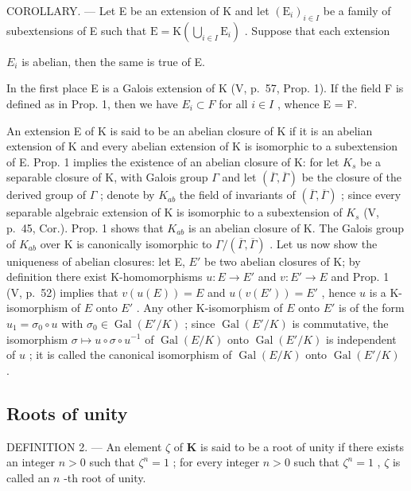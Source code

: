 COROLLARY. --- Let E be an extension of K and let \((\mathrm{E}_{i})_{i\in I}\) be a family of subextensions of E such that \(\mathrm{E}=\mathrm{K}\left(\bigcup_{i\in I}\mathrm{E}_{i}\right)\) . Suppose that each extension

\(E_{i}\) is abelian, then the same is true of E.

In the first place E is a Galois extension of K (V, p.~57, Prop. 1). If the field F is defined as in Prop. 1, then we have \(E_{i} \subset F\) for all \(i \in I\) , whence E = F.

An extension E of K is said to be an abelian closure of K if it is an abelian extension of K and every abelian extension of K is isomorphic to a subextension of E. Prop. 1 implies the existence of an abelian closure of K: for let \(K_{s}\) be a separable closure of K, with Galois group \(\Gamma\) and let \((\overline{\Gamma},\overline{\Gamma})\) be the closure of the derived group of \(\Gamma\) ; denote by \(K_{ab}\) the field of invariants of \((\overline{\Gamma},\overline{\Gamma})\) ; since every separable algebraic extension of K is isomorphic to a subextension of \(K_{s}\) (V, p.~45, Cor.). Prop. 1 shows that \(K_{ab}\) is an abelian closure of K. The Galois group of \(K_{ab}\) over K is canonically isomorphic to \(\Gamma/(\overline{\Gamma},\overline{\Gamma})\) . Let us now show the uniqueness of abelian closures: let E, \(E'\) be two abelian closures of K; by definition there exist K-homomorphisms \(u:E\to E'\) and \(v:E'\to E\) and Prop. 1 (V, p.~52) implies that \(v(u(E)) = E\) and \(u(v(E')) = E'\) , hence \(u\) is a K-isomorphism of \(E\) onto \(E'\) . Any other K-isomorphism of \(E\) onto \(E'\) is of the form \(u_1 = \sigma_0 \circ u\) with \(\sigma_0 \in \operatorname{Gal}(E'/K)\) ; since \(\operatorname{Gal}(E'/K)\) is commutative, the isomorphism \(\sigma \mapsto u \circ \sigma \circ u^{-1}\) of \(\operatorname{Gal}(E/K)\) onto \(\operatorname{Gal}(E'/K)\) is independent of \(u\) ; it is called the canonical isomorphism of \(\operatorname{Gal}(E/K)\) onto \(\operatorname{Gal}(E'/K)\) .

\subsection{Roots of unity}

DEFINITION 2. --- An element \(\zeta\) of \(\mathbf{K}\) is said to be a root of unity if there exists an integer \(n > 0\) such that \(\zeta^n = 1\) ; for every integer \(n > 0\) such that \(\zeta^n = 1\) , \(\zeta\) is called an \(n\) -th root of unity.

